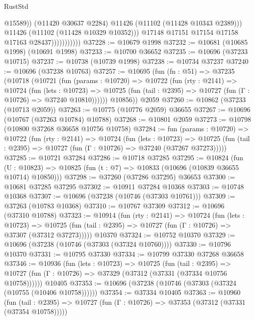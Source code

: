 \begin{lexlean}{RustStd}
\begin{coremodule}
                                  @15589))
                              (@11420 @30637 @2284)
                              @11426
                              (@11102 (@11428 @10343 @2389)))
                            @11426
                            (@11102 (@11428 @10329 @10352)))
                          @17148
                          @17151
                          @17154
                          @17158
                          @17163
                          @28437)))))))))))
@37228 := @10679 @1998
@37232 := @10681 (@10685 @1998) (@10691 @1998)
@37233 := @10700 @36652
@37235 := @10696 (@37233 @10715)
@37237 := @10738 (@10739 @1998)
@37238 := @10734 @37237
@37240 := @10696 (@37238 @10763)
@37257 := @10695
    (fun (fn : @51) =>
    @37235
      (@10718
        (@10721
          (fun (params : @10720) =>
          @10722
            (fun (rty : @2141) =>
            @10724
              (fun (lets : @10723) =>
              @10725 (fun (tail : @2395) => @10727 (fun (Γ : @10726) => @37240 @10810))))))
        @10856))
    @2059
@37260 := @10862 (@37233 (@10713 @2059))
@37263 := @10775 (@10776 @2059) @36655
@37267 := @10696 (@10767 (@37263 @10784) @10788)
@37268 := @10801 @2059
@37273 := @10798 (@10800 @37268 @36658 @10756 @10758)
@37284 := fun (params : @10720) =>
  @10722
    (fun (rty : @2141) =>
    @10724
      (fun (lets : @10723) =>
      @10725 (fun (tail : @2395) => @10727 (fun (Γ : @10726) => @37240 (@37267 @37273)))))
@37285 := @10721 @37284
@37286 := @10718 @37285
@37295 := @10824
    (fun (U : @10823) => @10825 (fun (t : @7) => @10833 (@10696 (@10839 @36655 @10714) @10850)))
@37298 := @37260 (@37286 @37295) @36653
@37300 := @10681 @37285 @37295
@37302 := @10911 @37284 @10368
@37303 := @10748 @10368
@37307 := @10696 (@37238 (@10746 (@37303 @10761)))
@37309 := @37263 (@10783 @10368)
@37310 := @10767 @37309
@37312 := @10696 (@37310 @10788)
@37323 := @10914
    (fun (rty : @2141) =>
    @10724
      (fun (lets : @10723) =>
      @10725 (fun (tail : @2395) => @10727 (fun (Γ : @10726) => @37307 (@37312 @37273)))))
    @10370
@37324 := @10752 @10370
@37329 := @10696 (@37238 (@10746 (@37303 (@37324 @10760))))
@37330 := @10796 @10370
@37331 := @10795 @37330
@37334 := @10799 @37330 @37268 @36658
@37346 := @10936
    (fun (lets : @10723) =>
    @10725
      (fun (tail : @2395) =>
      @10727 (fun (Γ : @10726) => @37329 (@37312 (@37331 (@37334 @10756 @10758))))))
    @10405
@37353 := @10696 (@37238 (@10746 (@37303 (@37324 (@10755 (@10406 @10758))))))
@37354 := @37334 @10405
@37363 := @10960
    (fun (tail : @2395) => @10727 (fun (Γ : @10726) => @37353 (@37312 (@37331 (@37354 @10758)))))

\end{coremodule}
\end{lexlean}
